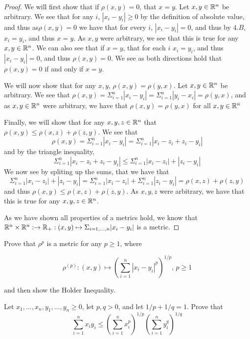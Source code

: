 \begin{proof}
  We will first show that if $\rho(x,y)=0$, that $x=y$. Let $x,y\in
  \mathbb{R}^n$ be arbitrary. We see that
  for any $i$, $|x_i-y_i|\geq 0$ by the definition of absolute value,
  and thus as$\rho(x,y) =0$ we have that for every $i$,
  $|x_i-y_i|=0$, and thus by $4.B$, $x_i=y_i$, and thus $x=y$. As
  $x,y$ were arbitrary, we see that this is true for any $x,y \in
  \mathbb{R}^n$. We can also see that if $x=y$, that for each $i$ $x_i=y_i$,
  and thus $|x_i-y_i| = 0$, and thus $\rho(x,y)=0$. We see as both
  directions hold that $\rho(x,y)=0$ if and only if $x=y$.

  We will now show that for any $x,y$, $\rho(x,y)=\rho(y,x)$. Let
  $x,y\in \mathbb{R}^n$ be arbitrary. We see that $\rho(x,y)= \Sigma_{i=1}^n
  |x_i-y_i| = \Sigma_{i=1}^n |y_i - x_i|= \rho(y,x)$, and as $x,y \in
  \mathbb{R}^n$ were arbitrary, we have that $\rho(x,y)=\rho(y,x)$ for all
  $x,y\in \mathbb{R}^n$

  Finally, we will show that for any $x,y,z \in \mathbb{R}^n$ that 
  $\rho(x,y) \leq \rho(x,z) + \rho(z,y)$. We see that 
  $$\rho(x,y) = \Sigma_{i=1}^n |x_i-y_i|=\Sigma_{i=1}^n
  |x_i-z_i+z_i-y_i| $$
  and by the triangle inequality, 
    $$\Sigma_{i=1}^n |x_i-z_i+z_i-y_i| \leq  \Sigma_{i=1}^n
    |x_i-z_i|+|z_i-y_i|$$
    We now see by spliting up the sums, that we have that 
    $$\Sigma_{i=1}^n  |x_i-z_i|+|z_i-y_i| = \Sigma_{i=1}^n |x_i-z_i|
    +\Sigma_{i=1}^n |z_i-y_i|=\rho(x,z)+\rho(z,y)$$
    and thus $\rho(x,y) \leq \rho(x,z)+\rho(z,y)$. As $x,y,z$ were
    arbitrary, we have that this is true for any $x,y,z \in \mathbb{R}^n$.

    As we have shown all properties of a metrics hold, we know that 
    $\mathbb{R}^n \times \mathbb{R}^n :\rightarrow \mathbb{R}_+: (x,y) \mapsto
  \Sigma_{i=1,...,n} |x_i- y_i|$ is a metric.
\end{proof}


\begin{minorEx}%
  Prove that $\rho^{p}$ is a metric for any $p \geq 1$, where

$$\rho^{(p)} : (x,y) \mapsto (\sum_{i=1}^n |x_i - y_i|^p)^{1/p} \text{,   }p\geq 1$$

and then show the Holder Inequality. 

Let $x_1,...,x_n,y_1,...,y_n \geq 0$, let $p,q >0$,
and let $1/p + 1/q =1$. Prove that
$$\sum_{i=1}^n x_iy_i \leq (\sum_{i=1}^n x_i^p)^{1/p} (\sum_{i=1}^ny_i^q)^{1/q}$$
\end{minorEx}

